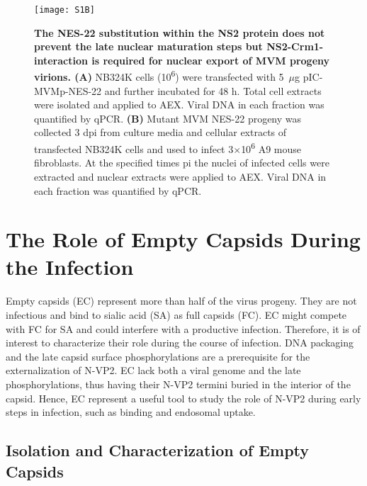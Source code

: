 \begin{figure}[h]
\centering
  \texttt{[image: S1B]} \\[0.3cm]
  \caption[NS2-Crm1 Interaction is Required for Nuclear Export but Does Not Influence the Late Nuclear Maturation of MVM]
   {\textbf{The NES-22 substitution \cite{pmid12239307} within the NS2 protein does not prevent the late nuclear maturation steps but NS2-Crm1-interaction is required for nuclear export of MVM progeny virions. (A)} NB324K cells (10\textsuperscript{6}) were transfected with 5~$\mu$g pIC-MVMp-NES-22 and further incubated for 48 h. Total cell extracts were isolated and applied to AEX. Viral DNA in each fraction was quantified by qPCR. \textbf{(B)} Mutant MVM NES-22 progeny was collected 3 dpi from culture media and cellular extracts of transfected NB324K cells and used to infect 3$\times$10\textsuperscript{6} A9 mouse fibroblasts. At the specified times pi the nuclei of infected cells were extracted and nuclear extracts were applied to AEX. Viral DNA in each fraction was quantified by qPCR.} 
\label{S1B}
\end{figure}


\clearpage

\section{The Role of Empty Capsids During the Infection}

Empty capsids (EC) represent more than half of the virus progeny. They are not infectious and bind to sialic acid (SA) as full capsids (FC). EC might compete with FC for SA and could interfere with a productive infection. Therefore, it is of interest to characterize their role during the course of infection. DNA packaging and the late capsid surface phosphorylations are a prerequisite for the externalization of N-VP2. EC lack both a viral genome and the late phosphorylations, thus having their N-VP2 termini buried in the interior of the capsid. Hence, EC represent a useful tool to study the role of N-VP2 during early steps in infection, such as binding and endosomal uptake.   

\subsection{Isolation and Characterization of Empty Capsids}

